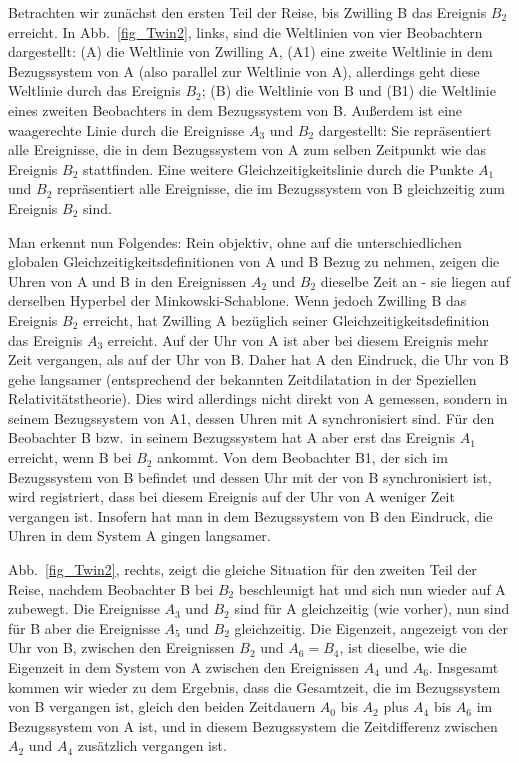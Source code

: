 Betrachten wir zun\"achst den ersten Teil der Reise, bis Zwilling B das Ereignis
$B_2$ erreicht. In Abb.\ \ref{fig_Twin2}, links, sind die Weltlinien von vier Beobachtern
dargestellt: (A) die Weltlinie von Zwilling A, (A1) eine zweite Weltlinie in dem 
Bezugssystem von A (also parallel zur Weltlinie von A), allerdings geht diese Weltlinie
durch das Ereignis $B_2$; (B) die Weltlinie von B und (B1) die Weltlinie eines
zweiten Beobachters in dem Bezugssystem von B. Au\ss erdem ist eine waagerechte
Linie durch die Ereignisse $A_3$ und $B_2$ dargestellt: Sie repr\"asentiert alle
Ereignisse, die in dem Bezugssystem von A zum selben Zeitpunkt wie das Ereignis
$B_2$ stattfinden. Eine weitere Gleichzeitigkeitslinie durch die Punkte $A_1$ und $B_2$
repr\"asentiert alle Ereignisse, die im Bezugssystem von B gleichzeitig zum Ereignis
$B_2$ sind. 

Man erkennt nun Folgendes: Rein objektiv, ohne auf die unterschiedlichen globalen 
Gleichzeitigkeitsdefinitionen von A
und B Bezug zu nehmen, zeigen die Uhren von A und B in den Ereignissen $A_2$ und $B_2$     
dieselbe Zeit an - sie liegen auf derselben Hyperbel der Minkowski-Schablone. 
Wenn jedoch Zwilling B das Ereignis $B_2$ erreicht, hat Zwilling 
A bez\"uglich seiner Gleichzeitigkeitsdefinition das Ereignis $A_3$ erreicht. Auf der Uhr von A
ist aber bei diesem Ereignis mehr Zeit vergangen, als auf der Uhr von B. Daher hat A den
Eindruck, die Uhr von B gehe langsamer (entsprechend der bekannten Zeitdilatation in der
Speziellen Relativit\"atstheorie). Dies wird allerdings nicht direkt von A gemessen, sondern
in seinem Bezugssystem von A1, dessen Uhren mit A synchronisiert sind.
F\"ur den Beobachter B bzw.\ in seinem Bezugssystem hat
A aber erst das Ereignis $A_1$ erreicht, wenn B bei $B_2$ ankommt. Von dem Beobachter
B1, der sich im Bezugssystem von B befindet und dessen Uhr mit der von B synchronisiert
ist, wird registriert, dass bei diesem Ereignis auf der Uhr von A weniger Zeit vergangen ist.
Insofern hat man in dem Bezugssystem von B den Eindruck, die Uhren in dem System A
gingen langsamer.  

Abb.\ \ref{fig_Twin2}, rechts, zeigt die gleiche Situation f\"ur den zweiten Teil der Reise,
nachdem Beobachter B bei $B_2$ beschleunigt hat und sich nun wieder auf A zubewegt. 
Die Ereignisse $A_3$ und $B_2$ sind f\"ur A gleichzeitig (wie vorher), nun sind f\"ur B aber
die Ereignisse $A_5$ und $B_2$ gleichzeitig. Die Eigenzeit, angezeigt von der Uhr von B,
zwischen den Ereignissen $B_2$ und $A_6=B_4$, ist dieselbe, wie die Eigenzeit in dem
System von A zwischen den Ereignissen $A_4$ und $A_6$. Insgesamt kommen wir wieder
zu dem Ergebnis, dass die Gesamtzeit, die im Bezugssystem von B vergangen ist, gleich
den beiden Zeitdauern $A_0$ bis $A_2$ plus $A_4$ bis $A_6$ im Bezugssystem von A ist,
und in diesem Bezugssystem die Zeitdifferenz zwischen $A_2$ und $A_4$ zus\"atzlich vergangen ist.

